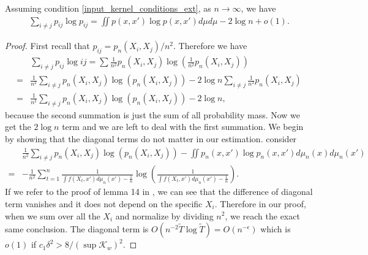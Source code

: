 \begin{lemma} \label{entropy_lemma_1}
    Assuming condition \ref{input_kernel_conditions_ext}, as $n \to \infty$, we have
    \begin{align}
        \sum_{i \neq j} p_{ij} \log p_{ij} = \iint p(x,x')\log p(x,x')d\mu d\mu - 2 \log n + o(1).
    \end{align}
\end{lemma}
\begin{proof}
    First recall that $p_{ij} = p_n(X_i,X_j)/n^2$. Therefore we have
    \begin{align}
          & \sum_{i \neq j}p_{ij} \log{ij} = \sum \frac{1}{n^2}p_n(X_i,X_j)\log\left(\frac{1}{n^2}p_n(X_i,X_j)\right) \nonumber           \\
        = & \frac{1}{n^2} \sum_{i \neq j} p_n(X_i,X_j) \log (p_n(X_i,X_j)) - 2 \log n\sum_{i \neq j} \frac{1}{n^2} p_n(X_i,X_j) \nonumber \\
        = & \frac{1}{n^2} \sum_{i \neq j} p_n(X_i,X_j) \log (p_n(X_i,X_j)) - 2 \log n,
    \end{align}
    because the second summation is just the sum of all probability mass. Now we get the $2 \log n$ term and we are left to deal with the first summation. We begin by showing that the diagonal terms do not matter in our estimation. consider
    \begin{align}
          & \frac{1}{n^2} \sum_{i \neq j} p_n(X_i,X_j) \log (p_n(X_i,X_j)) - \iint p_n(x,x')\log p_n(x,x') d\mu_n(x)d\mu_n(x') \nonumber                     \\
        = & - \frac{1}{n^2}\sum_{t=1}^{n} \frac{1}{\int f(X_t,x')d\mu_n(x') - \frac{1}{n}}\log\left(\frac{1}{\int f(X_t,x')d\mu_n(x') - \frac{1}{n}}\right).
    \end{align}
    If we refer to the proof of lemma 14 in \cite{auffinger-tsne}, we can see that the difference of diagonal term vanishes and it does not depend on the specific $X_i$. Therefore in our proof, when we sum over all the $X_i$ and normalize by dividing $n^2$, we reach the exact same conclusion. The diagonal term is $O(n^{-2}\tilde{T}\log \tilde{T}) = O(n^{-\epsilon})$ which is $o(1)$ if $c_1 \delta^2 > 8/(\sup \mathcal{K}_w)^2$.


\end{proof}
